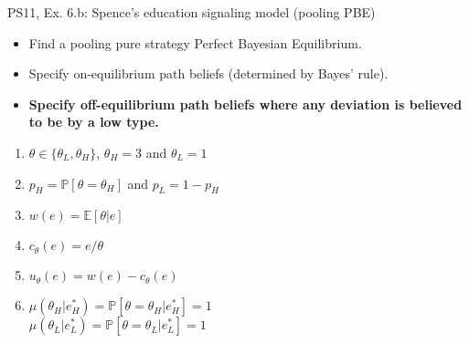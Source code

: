 \begin{frame}{PS11, Ex. 6.b: Spence’s education signaling model (pooling PBE)}
    \begin{itemize}
      \item[(b)] Find a pooling pure strategy Perfect Bayesian Equilibrium.
    \end{itemize}\vspace{-8pt}
    \begin{multicols}{2}
      \begin{itemize}
        \item[Step 1:] Specify on-equilibrium path beliefs (determined by Bayes' rule).
        \item[Step 2:] \textbf{Specify off-equilibrium path beliefs where any deviation is believed to be by a low type.}
      \end{itemize}
      \vfill\null\columnbreak
      \begin{enumerate}
        \item[Types:] $\theta\in\{\theta_L,\theta_H\}$, $\theta_H=3$ and $\theta_L=1$
        \item[Prob.:] $p_H=\mathbb{P}[\theta=\theta_H]$ and $p_L=1-p_H$
        \item[Wage:] $w(e)=\mathbb{E}[\theta|e]$
        \item[Cost:] $c_\theta(e)=e/\theta$
        \item[Utility:] $u_\theta(e)=w(e)-c_\theta(e)$
        \item $\mu\left(\theta_H|e_H^*\right)=
               \mathbb{P}\left[\theta=\theta_H|e_H^*\right]=1$\\
              $\mu\left(\theta_L|e_L^*\right)=
               \mathbb{P}\left[\theta=\theta_L|e_L^*\right]=1$
      \end{enumerate}
    \end{multicols}
    \vfill\null
\end{frame}
